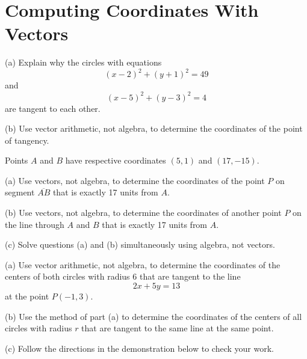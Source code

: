 \documentclass{ximera}
\begin{document}
\section{Computing Coordinates With Vectors}

\begin{question} \label{Q45340:Vectors}
(a) Explain why the circles with equations
\[
   (x-2)^2 + (y+1)^2  = 49
\]
and
\[
    (x-5)^2 + (y-3)^2 = 4
\]
are tangent to each other.

(b) Use vector arithmetic, not algebra, to determine the coordinates of the point of tangency.


\end{question}


\begin{question} \label{Q45323240:Vectors}
Points $A$ and $B$ have respective coordinates $(5,1)$ and $(17,-15)$. 

(a) Use vectors, not algebra, to determine the coordinates of the point $P$ on segment $\overline{AB}$ that is exactly 17 units from $A$.

(b) Use vectors, not algebra, to determine the coordinates of another point $P$ on the line through $A$ and $B$ that is exactly 17 units from $A$.

(c) Solve questions (a) and (b) simultaneously using algebra, not vectors.

\end{question}


\begin{question} \label{Q4df8240:Vectors}
(a) Use vector arithmetic, not algebra, to determine the coordinates of the centers of both circles with radius 6 that are tangent to the line
\[
    2x + 5y = 13
\]
at the point $P(-1,3)$.

(b) Use the method of part (a) to determine the coordinates of the centers of all circles with radius $r$ that are tangent to the same line at the same point.

(c) Follow the directions in the demonstration below to check your work.

 
\begin{onlineOnly}
    \begin{center}
\end{center}
\end{onlineOnly}

\end{question}
\end{document}
